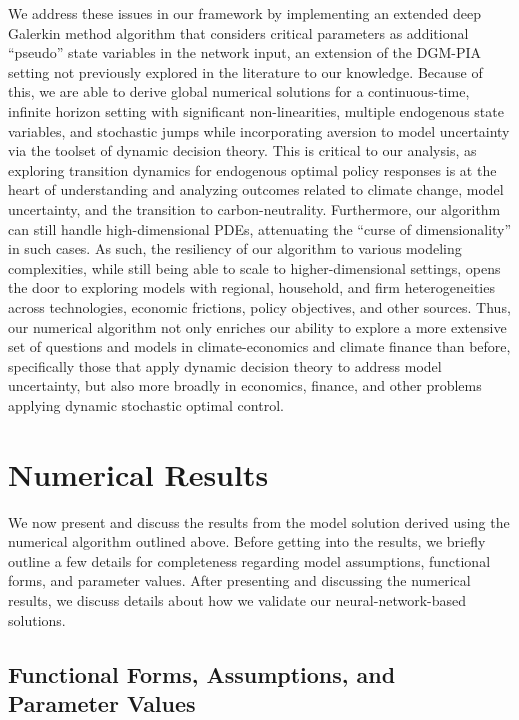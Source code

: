 \documentclass[12pt]{article}
\begin{document}
We address these issues in our framework by implementing an extended deep Galerkin method algorithm that considers critical parameters as additional ``pseudo'' state variables in the network input, an extension of the DGM-PIA setting not previously explored in the literature to our knowledge. Because of this, we are able to derive global numerical solutions for a continuous-time, infinite horizon setting with significant non-linearities, multiple endogenous state variables, and stochastic jumps while incorporating aversion to model uncertainty via the toolset of dynamic decision theory. This is critical to our analysis, as exploring transition dynamics for endogenous optimal policy responses is at the heart of understanding and analyzing outcomes related to climate change, model uncertainty, and the transition to carbon-neutrality. Furthermore, our algorithm can still handle high-dimensional PDEs, attenuating the ``curse of dimensionality'' in such cases. As such, the resiliency of our algorithm to various modeling complexities, while still being able to scale to higher-dimensional settings, opens the door to exploring models with regional, household, and firm heterogeneities across technologies, economic frictions, policy objectives, and other sources. Thus, our numerical algorithm not only enriches our ability to explore a more extensive set of questions and models in climate-economics and climate finance than before, specifically those that apply dynamic decision theory to address model uncertainty, but also more broadly in economics, finance, and other problems applying dynamic stochastic optimal control.


\section{Numerical Results}


We now present and discuss the results from the model solution derived using the numerical algorithm outlined above. Before getting into the results, we briefly outline a few details for completeness regarding model assumptions, functional forms, and parameter values. After presenting and discussing the numerical results, we discuss details about how we validate our neural-network-based solutions.

\subsection{Functional Forms, Assumptions, and Parameter Values}
\end{document}
